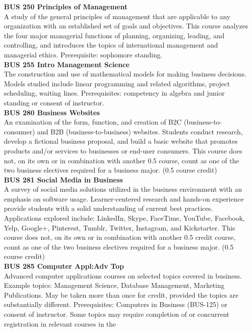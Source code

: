 \documentclass[
  letterpaper,
]{scrbook}
\begin{document}
\textbf{BUS 250 Principles of Management}\\
A study of the general principles of management that are applicable to
any organization with an established set of goals and objectives. This
course analyzes the four major managerial functions of planning,
organizing, leading, and controlling, and introduces the topics of
international management and managerial ethics. Prerequisite: sophomore
standing.\\
\textbf{BUS 255 Intro Management Science}\\
The construction and use of mathematical models for making business
decisions. Models studied include linear programming and related
algorithms, project scheduling, waiting lines. Prerequisites: competency
in algebra and junior standing or consent of instructor.\\
\textbf{BUS 280 Business Websites}\\
An examination of the form, function, and creation of B2C
(business-to-consumer) and B2B (business-to-business) websites. Students
conduct research, develop a fictional business proposal, and build a
basic website that promotes products and/or services to businesses or
end-user consumers. This course does not, on its own or in combination
with another 0.5 course, count as one of the two business electives
required for a business major. (0.5 course credit)\\
\textbf{BUS 281 Social Media in Business}\\
A survey of social media solutions utilized in the business environment
with an emphasis on software usage. Learner-centered research and
hands-on experience provide students with a solid understanding of
current best practices. Applications explored include: LinkedIn, Skype,
FaceTime, YouTube, Facebook, Yelp, Google+, Pinterest, Tumblr, Twitter,
Instagram, and Kickstarter. This course does not, on its own or in
combination with another 0.5 credit course, count as one of the two
business electives required for a business major. (0.5 course credit)\\
\textbf{BUS 285 Computer Appl:Adv Top}\\
Advanced computer applications courses on selected topics covered in
business. Example topics: Management Science, Database Management,
Marketing Publications. May be taken more than once for credit, provided
the topics are substantially different. Prerequisites: Computers in
Business (BUS-125) or consent of instructor. Some topics may require
completion of or concurrent registration in relevant courses in the
\end{document}
